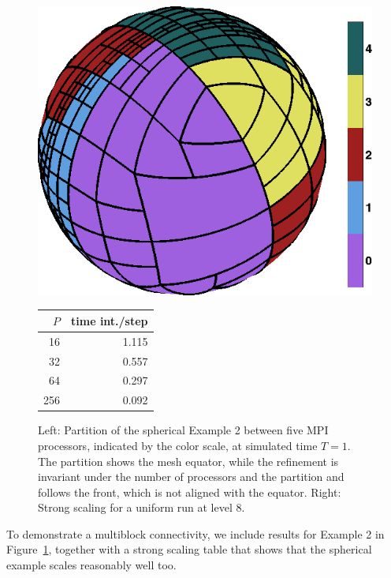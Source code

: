 \documentclass{IOS-Book-Article}     %
\newcommand{\Fig}[1]{Figure~\ref{fig:#1}}
\begin{document}
\begin{figure}
  \begin{center}
    \hspace{.1\columnwidth}
    \begin{minipage}[c]{.4\columnwidth}
      \includegraphics[width=.99\columnwidth]{../figs_misc/sphere_partition5}
    \end{minipage}
    \hspace{.05\columnwidth}
    \begin{minipage}[c]{.4\columnwidth}
    \begin{tabular}{r|r}
       $P$ & time int./step \\
      \hline
       16 & 1.115 \\
       32 & 0.557 \\
       64 & 0.297 \\
      256 & 0.092 \\
    \end{tabular}
  \end{minipage}
\end{center}
\caption{Left: Partition of the spherical Example 2 between five MPI processors, indicated
  by the color scale, at simulated time $T = 1$.  The partition shows the mesh equator,
  while the refinement is invariant under the number of processors and the partition
  and follows the front, which is not aligned with the equator.  Right: Strong scaling
  for a uniform run at level 8.}
\label{fig:spherical}
\end{figure}
To demonstrate a multiblock connectivity, we include results for Example 2 in
\Fig{spherical}, together with a strong scaling table that shows that the spherical
example scales reasonably well too.
\end{document}
